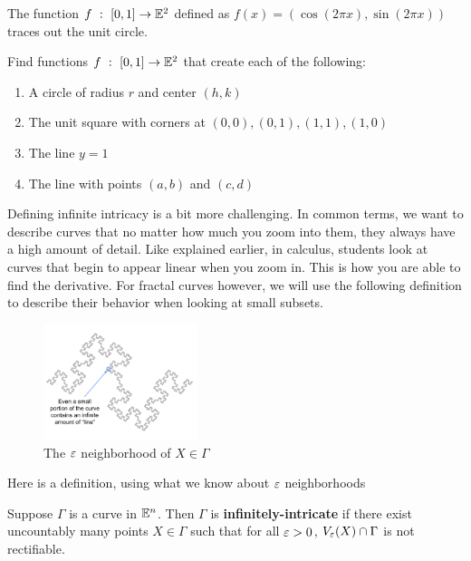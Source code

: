 The function $f\ :\ [0,1]\to\mathbb{E}^2$ defined as $f(x)=\left(\cos(2\pi x),\sin(2\pi x)\right)$ traces out the unit circle.\\

\begin{exercise}
    Find functions $f\ :\ [0,1]\to\mathbb{E}^2$ that create each of the following:
    \begin{enumerate}
        \item A circle of radius $r$ and center $(h,k)$
        \item The unit square with corners at $(0,0),(0,1),(1,1),(1,0)$
        \item The line $y=1$
        \item The line with points $(a,b)$ and $(c,d)$
    \end{enumerate}
\end{exercise}

Defining infinite intricacy is a bit more challenging. In common terms, we want to describe curves that no matter how much you zoom into them, they always have a high amount of detail. Like explained earlier, in calculus, students look at curves that begin to appear linear when you zoom in. This is how you are able to find the derivative. For fractal curves however, we will use the following definition to describe their behavior when looking at small subsets.\\ 

\begin{figure}
  \begin{center}
    \includegraphics[width=0.4\textwidth]{Images/1.1.3.png}
  \end{center}
  \caption{The $\varepsilon$ neighborhood of $X\in\Gamma$}
\end{figure}

Here is a definition, using what we know about $\varepsilon$ neighborhoods\\

\begin{definition}
    Suppose $\Gamma$ is a curve in $\mathbb{E}^n$. Then $\Gamma$ is \textbf{infinitely-intricate} if there exist uncountably many points  $X\in\Gamma$ such that for all $\varepsilon>0$, $V_\varepsilon(X)\cap \Gamma$ is not rectifiable.
\end{definition}



